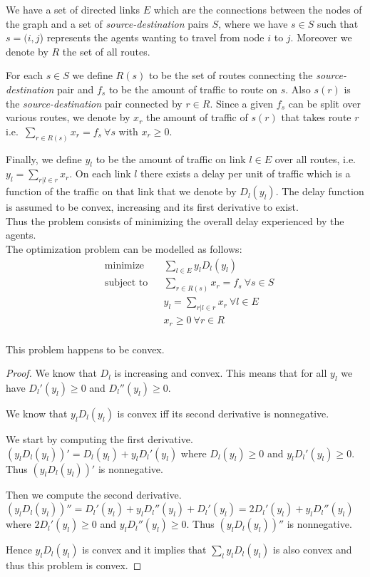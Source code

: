 We have a set of directed links $E$ which are the connections between the nodes of the graph and a set of \textit{source-destination} pairs $S$, where we have $s \in S$ such that $s = (i,j$) represents the agents wanting to travel from node $i$ to $j$. Moreover we denote by $R$ the set of all routes.

For each $s \in S$ we define $R(s)$ to be the set of routes connecting the \textit{source-destination} pair and $f_s$ to be the amount of traffic to route on $s$. Also $s(r)$ is the \textit{source-destination} pair connected by $r \in R$. Since a given $f_s$ can be split over various routes, we denote by $x_r$ the amount of traffic of $s(r)$ that takes route $r$ i.e.\ $\sum\limits_{r \in R(s)}^{} x_r = f_s\ \forall s$ with $x_r \ge 0$.

Finally, we define $y_l$ to be the amount of traffic on link $l \in E$ over all routes, i.e.\ $y_l=\sum\limits_{r | l \in r} x_r$. On each link $l$ there exists a delay per unit of traffic which is a function of the traffic on that link that we denote by $D_l(y_l)$. The delay function is assumed to be convex, increasing and its first derivative to exist.\\

Thus the problem consists of minimizing the overall delay experienced by the agents.\\

The optimization problem can be modelled as follows:
\begin{equation}
\begin{aligned}
& {\text{minimize}}
    & &  \sum_{l \in E} y_{l} D_{l}(y_{l}) \\
& \text{subject to}
& & \sum_{r \in R(s)} x_{r} = f_{s}\ \forall s \in S\\
&       & &  y_{l} = \sum\limits_{r|l \in r} x_{r}\ \forall l \in E\\
&      &&  x_{r} \geq 0\ \forall r \in R\\
\end{aligned}
\label{e:prob}
\end{equation}

This problem happens to be convex.

\begin{proof}
        We know that $D_l$ is increasing and convex. This means that for all $y_l$ we have $D_l'(y_l) \ge 0$ and $D_l''(y_l) \ge 0$.

        We know that $y_lD_l(y_l)$ is convex iff its second derivative is nonnegative.

        We start by computing the first derivative. $(y_lD_l(y_l))' = D_l(y_l) + y_lD_l'(y_l)$ where $D_l(y_l) \ge 0$ and $y_lD_l'(y_l) \ge 0$. Thus $(y_lD_l(y_l))'$ is nonnegative.

        Then we compute the second derivative. $(y_lD_l(y_l))'' = D_l'(y_l) + y_lD_l''(y_l) + D_l'(y_l) = 2D_l'(y_l) + y_lD_l''(y_l)$ where $2D_l'(y_l) \ge 0$ and $y_lD_l''(y_l) \ge 0$. Thus $(y_lD_l(y_l))''$ is nonnegative.

        Hence $y_lD_l(y_l)$ is convex and it implies that $\sum\limits_{l} y_{l}D_{l}(y_{l})$ is also convex and thus this problem is convex.
\end{proof}

